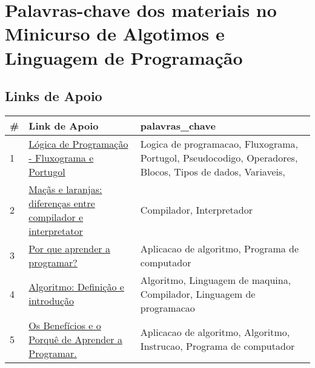 \chapter{Palavras-chave dos materiais no Minicurso de Algotimos e Linguagem de Programação}\label{ape:dicionario-palavras-chave}

\section{Links de Apoio}

\begin{longtable}{| p{} | p{} | p{} |}
\hline
\#  & Link de Apoio                                                                                                                                                                                                                & palavras\_chave                                                                                                                                   \\ \hline
1   & \href{http://academicotech.blogspot.com.br/2014/02/v-behaviorurldefaultvmlo.html}{Lógica de Programação - Fluxograma e Portugol                                       } & Logica de programacao, Fluxograma, Portugol, Pseudocodigo, Operadores, Blocos, Tipos de dados, Variaveis,                                         \\ \hline
2   & \href{http://blog.academiadocodigo.com.br/2014/12/macas-e-laranjas-diferencas-entre-compilador-e-interpretator/}{Maçãs e laranjas: diferenças entre compilador e interpretator                       } & Compilador, Interpretador                                                                                                                         \\ \hline
3   & \href{http://blog.triadworks.com.br/por-que-aprender-a-programar}{Por que aprender a programar?                                                       } & Aplicacao de algoritmo, Programa de computador                                                                                                    \\ \hline
4   & \href{http://br.ccm.net/faq/9709-algoritmo-definicao-e-introducao}{Algoritmo: Definição e introdução                                                   } & Algoritmo, Linguagem de maquina, Compilador, Linguagem de programacao                                                                             \\ \hline
5   & \href{http://coral.ufsm.br/pet-si/index.php/os-beneficios-e-o-porque-de-aprender-a-programar/}{Os Benefícios e o Porquê de Aprender a Programar.                                   } & Aplicacao de algoritmo, Algoritmo, Instrucao, Programa de computador                                                                              \\ \hline

\end{longtable}
